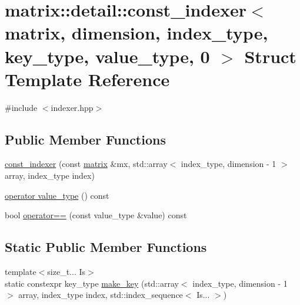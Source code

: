 \hypertarget{structmatrix_1_1detail_1_1const__indexer_3_01matrix_00_01dimension_00_01index__type_00_01key__type_00_01value__type_00_010_01_4}{}\section{matrix\+:\+:detail\+:\+:const\+\_\+indexer$<$ matrix, dimension, index\+\_\+type, key\+\_\+type, value\+\_\+type, 0 $>$ Struct Template Reference}
\label{structmatrix_1_1detail_1_1const__indexer_3_01matrix_00_01dimension_00_01index__type_00_01key__type_00_01value__type_00_010_01_4}


{\ttfamily \#include $<$indexer.\+hpp$>$}

\subsection*{Public Member Functions}
\begin{DoxyCompactItemize}
\item 
\hyperlink{structmatrix_1_1detail_1_1const__indexer_3_01matrix_00_01dimension_00_01index__type_00_01key__type_00_01value__type_00_010_01_4_a90d5070efaa89ac38a8a8d3cdc2d2ff6}{const\+\_\+indexer} (const \hyperlink{structmatrix_1_1matrix}{matrix} \&mx, std\+::array$<$ index\+\_\+type, dimension -\/ 1 $>$ array, index\+\_\+type index)
\item 
\hyperlink{structmatrix_1_1detail_1_1const__indexer_3_01matrix_00_01dimension_00_01index__type_00_01key__type_00_01value__type_00_010_01_4_a4c7c48e08a93568624bc39b93cbce49c}{operator value\+\_\+type} () const
\item 
bool \hyperlink{structmatrix_1_1detail_1_1const__indexer_3_01matrix_00_01dimension_00_01index__type_00_01key__type_00_01value__type_00_010_01_4_a9410cf64bd67b22b726b573b56f9b095}{operator==} (const value\+\_\+type \&value) const
\end{DoxyCompactItemize}
\subsection*{Static Public Member Functions}
\begin{DoxyCompactItemize}
\item 
{\footnotesize template$<$size\+\_\+t... Is$>$ }\\static constexpr key\+\_\+type \hyperlink{structmatrix_1_1detail_1_1const__indexer_3_01matrix_00_01dimension_00_01index__type_00_01key__type_00_01value__type_00_010_01_4_aa07f9b2e45c22c5b15f87428cc16a1bc}{make\+\_\+key} (std\+::array$<$ index\+\_\+type, dimension -\/ 1 $>$ array, index\+\_\+type index, std\+::index\+\_\+sequence$<$ Is... $>$)
\end{DoxyCompactItemize}


